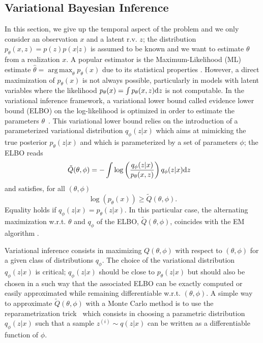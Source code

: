 \documentclass{article}
\DeclareMathOperator*{\argmax}{arg\,max}
\def\x{{\mathbf x}}
\def\z{{\mathbf z}}
\def\p{p_{\theta}}
\def\q{q_\phi}
\def\Q{\tilde{Q}}
\begin{document}
\subsection{Variational Bayesian Inference}
\label{subsec:varinf}
In this section, we give up the temporal aspect of the problem and we only consider an observation $x$ and 
a latent r.v. $z$; the distribution
$\p(x,z)=p(z)p(x|z)$ is assumed to be known and we want to estimate
$\theta$ from a realization $x$.
A popular estimator is the Maximum-Likelihood (ML) estimate 
$\hat{\theta}=\argmax_{\theta} \p(x)$
due to its statistical properties \cite{White-MLE, Douc-ML-MIS}.
However, a direct maximization of $\p(x)$ is not always possible, particularly in
models with latent variables where the likelihood
$\p(x)=\int \p(x,z) {\rm d}z$ is not computable. 
In the variational inference framework, a variational lower bound called evidence lower bound 
(ELBO) on the log-likelihood  is optimized in order to estimate the parameters $\theta$~\cite{Jordan99anintroduction}.
This variational lower bound relies on the introduction of a parameterized 
variational distribution $\q(z|x)$ which aims at mimicking the true posterior $\p(z|x)$ and which is parameterized by a set of parameters $\phi$;
the ELBO reads
\begin{align}
\label{eq:elbo}
&\Q(\theta,\phi) = - \int \log \left(\frac{\q(z|x)}{\p(x,z)}\right) \q(z|x) {\rm d} z 
\end{align}
and satisfies, for all $(\theta,\phi)$
$$\log(\p(x)) \geq \Q(\theta,\phi) \text{.} $$
Equality holds if $\q(z|x)= \p(z|x)$.
In this particular case, 
the alternating  maximization w.r.t. $\theta$ and $\q$  of the ELBO, $\Q(\theta,\phi)$,
coincides with the EM algorithm \cite{variational-EM}. 

Variational inference consists in maximizing $Q(\theta,\phi)$ 
with respect to $(\theta,\phi)$ for a given class of distributions $\q$. 
The choice of the variational distribution $\q(z|x)$ is critical; 
$\q(z|x)$  should be close to $\p(z|x)$ but should also
be chosen in a such way that the associated ELBO can be exactly computed or easily approximated while remaining differentiable w.r.t. $(\theta,\phi)$. 
A simple way to approximate $\Q(\theta,\phi)$ with a Monte Carlo method  is to use the reparametrization 
trick~\cite{kingma2013auto} which consists in choosing a parametric
distribution $\q(z|x)$ such that a sample $z^{(i)} \sim q(z|x)$ can
be written as a differentiable function of $\phi$.
\end{document}
